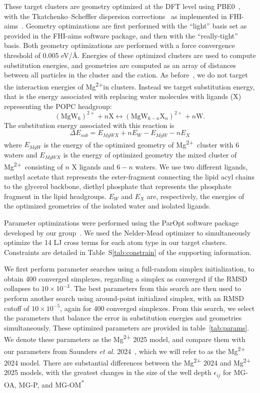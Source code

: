 \documentclass[journal=langd5,manuscript=article]{achemso}
\newcommand{\etal}{\textit{et al.}}
\newcommand{\mg}{Mg\textsuperscript{2+}}
\newcommand{\epsilonij}{$\epsilon_{ij}$}
\begin{document}
These target clusters are geometry optimized at the DFT level using PBE0~\cite{adamo:1999:toward}, 
with the Tkatchenko–Scheffler 
dispersion corrections~\cite{tkatchenko:2009} as implemented in FHI-aims~\cite{fhiaims}. 
Geometry optimizations are first performed with the ``light'' basis set as provided in the 
FHI-aims software package, and then with the ``really-tight'' basis. Both
geometry optimizations are performed with a force 
convergence threshold of 0.005 eV/\AA. Energies of these optimized clusters are used to compute substitution energies, and
geometries are computed as an array of distances between all particles in the cluster and the cation.
As before~\cite{saunders:2022}, we do not target the interaction energies of \mg in clusters. Instead we target substitution energy, that is the energy associated with replacing water molecules with ligands (X) representing the POPC headgroup:
\begin{equation}
(\mathrm{Mg} \mathrm{W}_{6})^{2+} + n\mathrm{X} \longleftrightarrow (\mathrm{Mg} \mathrm{W}_{6-n} \mathrm{X}_n)^{2+} + n\mathrm{W}.
\end{equation}
The substitution energy associated with this reaction is
\begin{equation}
\Delta E_{sub} = E_{MgWX} + nE_{W} - E_{MgW} - nE_{X}
\label{equ_2}
\end{equation}
where $E_{MgW}$ is the energy of the optimized geometry of \mg~cluster with 6 waters and $E_{MgWX}$ is the energy of optimized geometry the mixed cluster of \mg~consisting of $n$ X ligands and $6-n$ waters. We use two different ligands, methyl acetate that represents the ester-fragment 
connecting the lipid acyl chains to the glycerol backbone, diethyl phosphate that represents the
phosphate fragment in the lipid headgroups. $E_{W}$ and $E_X$ are, respectively, the energies of the optimized geometries of the isolated water and isolated ligands.

Parameter optimizations were performed using the ParOpt software package developed by our group~\cite{fogarty:2014:paropt}. We used the Nelder-Mead optimizer to simultaneously optimize
the 14 LJ cross terms for each atom type in our target clusters. Constraints are detailed in Table~S\ref{tab:constrain} of the supporting information. 

We first perform parameter searches using a full-random simplex initialization, 
to obtain 400 converged simplexes, regarding a simplex as converged if the RMSD collapses to $10\times{}10^{-3}$. The best parameters from this search are then used
to perform another search using around-point initialized simplex, with an RMSD cutoff of $10\times{}10^{-5}$, again for 400 converged simplexes. From this search, we select the parameters that balance
the error in substitution energies and geometries simultaneously. 
These optimized parameters are provided in table~\ref{tab:params}. We denote these parameters as the \mg{ 2025} model, and compare them with our parameters from 
Saunders \etal{} 2024~\cite{saunders:2024}, which we will refer to as the \mg{ 2024} model.
There are substantial differences between the \mg{ 2024} and \mg{ 2025} models, with the greatest changes in the size of the well depth \epsilonij{} for MG-OA, MG-P, and MG-OM\textsuperscript{*}
\end{document}
